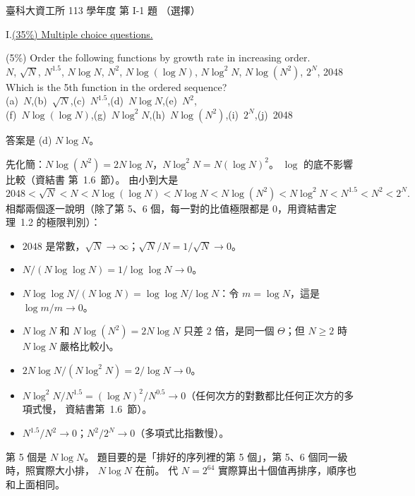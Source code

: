 \begin{pastexam}[label={px:ntust-113-ice-01}]{臺科大資工所 113 學年度 第 I-1 題}
（選擇）

I.\quad \underline{(35\%) Multiple choice questions.}

(5\%) Order the following functions by growth rate in increasing order.\\
$N$, $\sqrt{N}$, $N^{1.5}$, $N\log N$, $N^2$, $N\log(\log N)$, $N\log^2 N$, $N\log(N^2)$, $2^N$,
2048\\
Which is the 5th function in the ordered sequence?\\
(a)~$N$,\quad (b)~$\sqrt{N}$,\quad (c)~$N^{1.5}$,\quad (d)~$N\log N$,\quad (e)~$N^2$,\\
(f)~$N\log(\log N)$,\quad (g)~$N\log^2 N$,\quad (h)~$N\log(N^2)$,\quad (i)~$2^N$,\quad (j)~2048
\end{pastexam}

\begin{pastsoln}
答案是 (d) $N \log N$。

先化簡：$N \log(N^2) = 2N \log N$，$N \log^2 N = N (\log N)^2$。 $\log$ 的底不影響比較（資結書
第~1.6~節）。 由小到大是
\[
2048 < \sqrt{N} < N < N \log(\log N) < N \log N < N \log(N^2) < N \log^2 N < N^{1.5} < N^2 < 2^N .
\]
相鄰兩個逐一說明（除了第 5、6 個，每一對的比值極限都是 $0$，用資結書定理~1.2 的極限判別）：
\begin{itemize}
\item $2048$ 是常數，$\sqrt{N} \to \infty$；$\sqrt{N} / N = 1/\sqrt{N} \to 0$。
\item $N / (N \log\log N) = 1 / \log\log N \to 0$。
\item $N \log\log N / (N \log N) = \log\log N / \log N$：令 $m = \log N$，這是 $\log m / m \to 0$。
\item $N \log N$ 和 $N \log(N^2) = 2N \log N$ 只差 $2$ 倍，是同一個 $\Theta$；但 $N \ge 2$ 時 $N \log N$
嚴格比較小。
\item $2N \log N / (N \log^2 N) = 2 / \log N \to 0$。
\item $N \log^2 N / N^{1.5} = (\log N)^2 / N^{0.5} \to 0$（任何次方的對數都比任何正次方的多項式慢，
資結書第~1.6~節）。
\item $N^{1.5} / N^2 \to 0$；$N^2 / 2^N \to 0$（多項式比指數慢）。
\end{itemize}
第 5 個是 $N \log N$。 題目要的是「排好的序列裡的第 5 個」，第 5、6 個同一級時，照實際大小排，
$N \log N$ 在前。 代 $N = 2^{64}$ 實際算出十個值再排序，順序也和上面相同。
\end{pastsoln}
